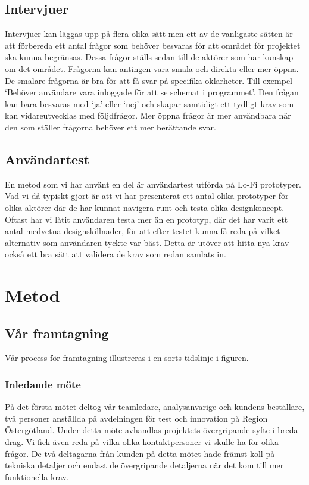 \subsection{Intervjuer}\label{sec:ch-intervju}
Intervjuer kan läggas upp på flera olika sätt men ett av de vanligaste sätten är att förbereda ett antal frågor som behöver besvaras för att området för projektet ska kunna begränsas. Dessa frågor ställs sedan till de aktörer som har kunskap om det området. Frågorna kan antingen vara smala och direkta eller mer öppna. De smalare frågorna är bra för att få svar på specifika oklarheter. Till exempel ‘Behöver användare vara inloggade för att se schemat i programmet’. Den frågan kan bara besvaras med ‘ja’ eller ‘nej’ och skapar samtidigt ett tydligt krav som kan vidareutvecklas med följdfrågor. Mer öppna frågor är mer användbara när den som ställer frågorna behöver ett mer berättande svar.

\subsection{Användartest}
En metod som vi har använt en del är användartest utförda på Lo-Fi prototyper. Vad vi då typiskt gjort är att vi har presenterat ett antal olika prototyper för olika aktörer där de har kunnat navigera runt och testa olika designkoncept. Oftast har vi låtit användaren testa mer än en prototyp, där det har varit ett antal medvetna designskillnader, för att efter testet kunna få reda på vilket alternativ som användaren tyckte var bäst. Detta är utöver att hitta nya krav också ett bra sätt att validera de krav som redan samlats in.

\section{Metod}
\subsection{Vår framtagning}
Vår process för framtagning illustreras i en sorts tidslinje i figuren.

\subsubsection{Inledande möte}
På det första mötet deltog vår teamledare, analysanvarige och kundens beställare, två personer anställda på avdelningen för test och innovation på Region Östergötland. Under detta möte avhandlas projektets övergripande syfte i breda drag.
Vi fick även reda på vilka olika kontaktpersoner vi skulle ha för olika frågor. De två deltagarna från kunden på detta mötet hade främst koll på tekniska detaljer och endast de övergripande detaljerna när det kom till mer funktionella krav.

